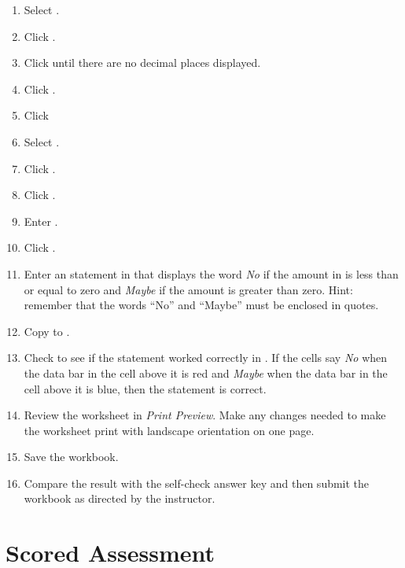 \begin{enumerate}
	\item Select .
	\item Click .
	\item Click  until there are no decimal places displayed.
	\item Click .
	\item Click  

	\item Select . 
	\item Click .
	
	\item Click . 
	\item Enter . 
	\item Click .
	\item Enter an  statement in that displays the word \textit{No} if the amount in  is less than or equal to zero and \textit{Maybe} if the amount is greater than zero. Hint: remember that the words ``No'' and ``Maybe'' must be enclosed in quotes. 
	\item Copy  to .

	\item Check to see if the  statement worked correctly in . If the cells say \textit{No} when the data bar in the cell above it is red and \textit{Maybe} when the data bar in the cell above it is blue, then the  statement is correct.

	\item Review the worksheet in \textit{Print Preview}. Make any changes needed to make the worksheet print with landscape orientation on one page.

	\item Save the  workbook.
	\item Compare the result with the self-check answer key and then submit the  workbook as directed by the instructor.
\end{enumerate}

\section{Scored Assessment}

